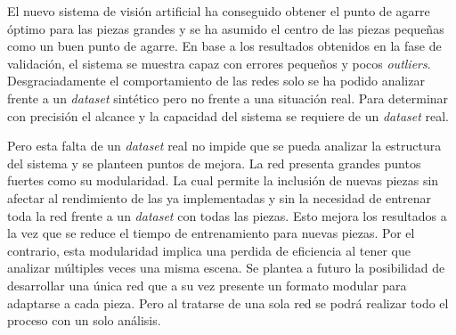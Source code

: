 {El nuevo sistema de visión artificial ha conseguido obtener el punto de agarre óptimo para las piezas grandes y se ha asumido el centro de las piezas pequeñas como un buen punto de agarre. En base a los resultados obtenidos en la fase de validación, el sistema se muestra capaz con errores pequeños y pocos \textit{outliers}. Desgraciadamente el comportamiento de las redes solo se ha podido analizar frente a un \textit{dataset} sintético pero no frente a una situación real. Para determinar con precisión el alcance y la capacidad del sistema se requiere de un \textit{dataset} real.

Pero esta falta de un \textit{dataset} real no impide que se pueda analizar la estructura del sistema y se planteen puntos de mejora. La red presenta grandes puntos fuertes como su modularidad. La cual permite la inclusión de nuevas piezas sin afectar al rendimiento de las ya implementadas y sin la necesidad de entrenar toda la red frente a un \textit{dataset} con todas las piezas. Esto mejora los resultados a la vez que se reduce el tiempo de entrenamiento para nuevas piezas. Por el contrario, esta modularidad implica una perdida de eficiencia al tener que analizar múltiples veces una misma escena. Se plantea a futuro la posibilidad de desarrollar una única red que a su vez presente un formato modular para adaptarse a cada pieza. Pero al tratarse de una sola red se podrá realizar todo el proceso con un solo análisis.  
}